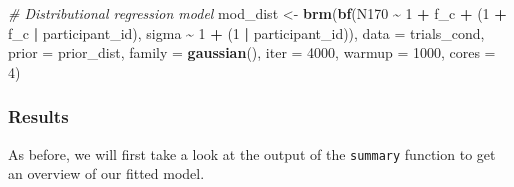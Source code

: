 \documentclass[
  doc,12pt,floatsintext]{apa7}
\newenvironment{Shaded}{\begin{snugshade}}{\end{snugshade}}
\newcommand{\AttributeTok}[1]{\textcolor[rgb]{0.13,0.29,0.53}{#1}}
\newcommand{\CommentTok}[1]{\textcolor[rgb]{0.56,0.35,0.01}{\textit{#1}}}
\newcommand{\DecValTok}[1]{\textcolor[rgb]{0.00,0.00,0.81}{#1}}
\newcommand{\FunctionTok}[1]{\textcolor[rgb]{0.13,0.29,0.53}{\textbf{#1}}}
\newcommand{\NormalTok}[1]{#1}
\newcommand{\OtherTok}[1]{\textcolor[rgb]{0.56,0.35,0.01}{#1}}
\newcommand{\SpecialCharTok}[1]{\textcolor[rgb]{0.81,0.36,0.00}{\textbf{#1}}}
\begin{document}
\begin{Shaded}
\begin{Highlighting}[]
\CommentTok{\# Distributional regression model }
\NormalTok{mod\_dist }\OtherTok{\textless{}{-}} \FunctionTok{brm}\NormalTok{(}\FunctionTok{bf}\NormalTok{(N170 }\SpecialCharTok{\textasciitilde{}} \DecValTok{1} \SpecialCharTok{+}\NormalTok{ f\_c }\SpecialCharTok{+}\NormalTok{ (}\DecValTok{1} \SpecialCharTok{+}\NormalTok{ f\_c }\SpecialCharTok{|}\NormalTok{ participant\_id), }
\NormalTok{                   sigma }\SpecialCharTok{\textasciitilde{}} \DecValTok{1} \SpecialCharTok{+}\NormalTok{ (}\DecValTok{1} \SpecialCharTok{|}\NormalTok{ participant\_id)), }
                \AttributeTok{data =}\NormalTok{ trials\_cond, }
                \AttributeTok{prior =}\NormalTok{ prior\_dist,}
                \AttributeTok{family =} \FunctionTok{gaussian}\NormalTok{(),}
                \AttributeTok{iter =} \DecValTok{4000}\NormalTok{,}
                \AttributeTok{warmup =} \DecValTok{1000}\NormalTok{,}
                \AttributeTok{cores =} \DecValTok{4}\NormalTok{) }
\end{Highlighting}
\end{Shaded}

\subsubsection{Results}\label{results-2}

As before, we will first take a look at the output of the \texttt{summary} function to get an overview of our fitted model.

\footnotesize
\end{document}
